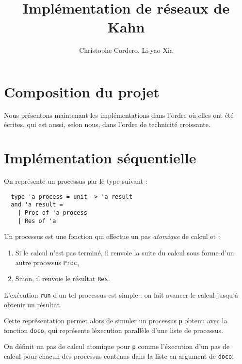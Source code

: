 \documentclass[11pt]{article}
\begin{document}
\title{Impl\'ementation de r\'eseaux de Kahn}

\author{Christophe Cordero, Li-yao Xia}

\maketitle

\section{Composition du projet}

Nous pr\'esentons maintenant les impl\'ementations dans l'ordre
o\`u elles ont \'et\'e \'ecrites, qui est aussi, selon nous, dans l'ordre de technicit\'e croissante.

\section{Impl\'ementation s\'equentielle}

On repr\'esente un processus par le type suivant :

\begin{lstlisting}
  type 'a process = unit -> 'a result
  and 'a result =
    | Proc of 'a process
    | Res of 'a
\end{lstlisting}

Un processus est une fonction qui effectue
un pas {\em atomique} de calcul et :

\begin{enumerate}
  \item Si le calcul n'est pas termin\'e,
    il renvoie la suite du calcul sous forme d'un autre processus {\tt Proc},
  \item Sinon, il renvoie le r\'esultat {\tt Res}.
\end{enumerate}

L'ex\'ecution {\tt run} d'un tel processus est simple :
on fait avancer le calcul jusqu'\`a obtenir un r\'esultat.

\smallskip

Cette repr\'esentation permet alors de simuler un processus {\tt p}
obtenu avec la fonction {\tt doco}, qui repr\'esente l\'execution
parall\`ele d'une liste de processus.

On d\'efinit un pas de calcul atomique pour {\tt p}
comme l'\'execution d'un pas de calcul pour chacun des processus
contenus dans la liste en argument de {\tt doco}.

\smallskip
\end{document}
